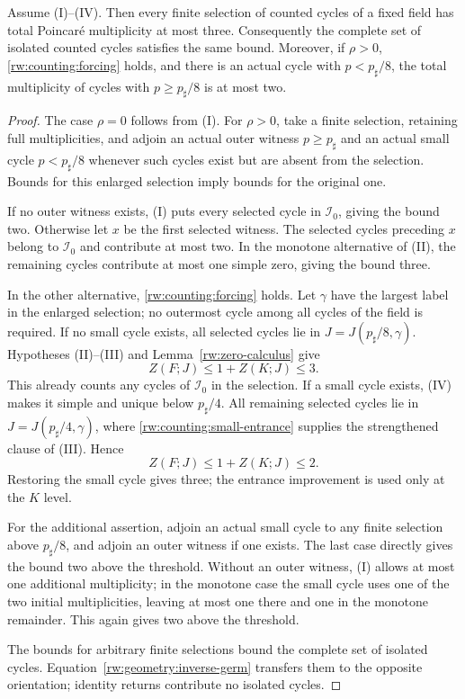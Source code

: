 \begin{proposition}
\label{rw:conditional-three}
Assume \textup{(I)--(IV)}.  Then every finite selection of counted cycles
of a fixed field has total Poincar\'e multiplicity at most three.
Consequently the complete set of isolated counted cycles satisfies the
same bound.  Moreover, if $\rho>0$, \eqref{rw:counting:forcing} holds, and there is
an actual cycle with $p<p_\sharp/8$, the total multiplicity of cycles
with $p\ge p_\sharp/8$ is at most two.
\end{proposition}
\begin{proof}
The case $\rho=0$ follows from (I). For $\rho>0$, take a finite
selection, retaining full multiplicities, and adjoin an actual outer
witness $p\ge p_\sharp$ and an actual small cycle $p<p_\sharp/8$
whenever such cycles exist but are absent from the selection. Bounds
for this enlarged selection imply bounds for the original one.

If no outer witness exists, (I) puts every selected cycle in
$\mathcal I_0$, giving the bound two. Otherwise let $x$ be the first
selected witness. The selected cycles preceding $x$ belong to
$\mathcal I_0$ and contribute at most two. In the monotone alternative
of (II), the remaining cycles contribute at most one simple zero,
giving the bound three.

In the other alternative, \eqref{rw:counting:forcing} holds.
Let $\gamma$ have the largest label in the enlarged selection; no
outermost cycle among all cycles of the field is required. If no
small cycle exists, all selected cycles lie in
$J=J(p_\sharp/8,\gamma)$. Hypotheses (II)--(III) and
Lemma~\ref{rw:zero-calculus} give
\[
 Z(F;J)\le1+Z(K;J)\le3.
\]
This already counts any cycles of $\mathcal I_0$ in the selection.
If a small cycle exists, (IV) makes it simple and unique below
$p_\sharp/4$. All remaining selected cycles lie in
$J=J(p_\sharp/4,\gamma)$, where
\eqref{rw:counting:small-entrance} supplies the strengthened clause
of (III). Hence
\[
 Z(F;J)\le1+Z(K;J)\le2.
\]
Restoring the small cycle gives three; the entrance improvement is
used only at the $K$ level.

For the additional assertion, adjoin an actual small cycle to any
finite selection above $p_\sharp/8$, and adjoin an outer witness if
one exists. The last case directly gives the bound two above the
threshold. Without an outer witness, (I) allows at most one additional
multiplicity; in the monotone case the small cycle uses one of the
two initial multiplicities, leaving at most one there and one in the
monotone remainder. This again gives two above the threshold.

The bounds for arbitrary finite selections bound the complete set
of isolated cycles. Equation~\eqref{rw:geometry:inverse-germ}
transfers them to the opposite orientation; identity returns contribute
no isolated cycles.
\end{proof}

